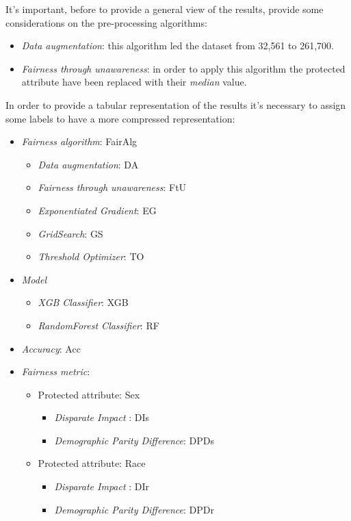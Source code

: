 It's important, before to provide a general view of the results, provide some considerations on the pre-processing algorithms:

\begin{itemize}
    \item \emph{Data augmentation}: this algorithm led the dataset from 32,561 to 261,700.
    \item \emph{Fairness through unawareness}: in order to apply this algorithm the protected attribute have been replaced with their \emph{median} value.
\end{itemize}

In order to provide a tabular representation of the results it's necessary to assign some labels to have a more compressed representation:

\begin{itemize}
    \item \emph{Fairness algorithm}: FairAlg
    \begin{itemize}
        \item \emph{Data augmentation}: DA
        \item \emph{Fairness through unawareness}: FtU
        \item \emph{Exponentiated Gradient}: EG
        \item \emph{GridSearch}: GS
        \item \emph{Threshold Optimizer}: TO
    \end{itemize}
    \item \emph{Model}
    \begin{itemize}
        \item \emph{XGB Classifier}: XGB
        \item \emph{RandomForest Classifier}: RF
    \end{itemize}
    \item \emph{Accuracy}: Acc
    \item \emph{Fairness metric}:
    \begin{itemize}
        \item Protected attribute: Sex
        \begin{itemize}
            \item \emph{Disparate Impact }: DIs
            \item \emph{Demographic Parity Difference}: DPDs
        \end{itemize}
        \item Protected attribute: Race
        \begin{itemize}
            \item \emph{Disparate Impact }: DIr
            \item \emph{Demographic Parity Difference}: DPDr
        \end{itemize}
    \end{itemize}
\end{itemize}

